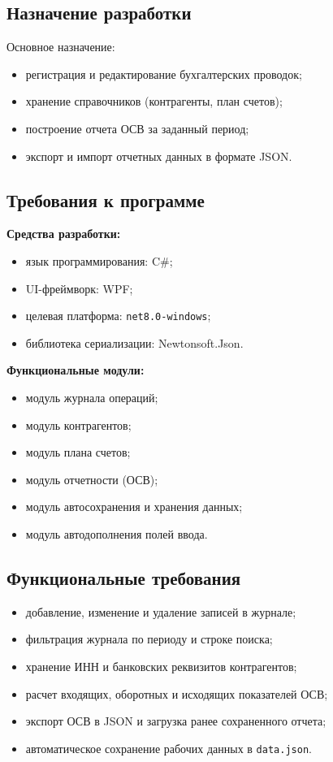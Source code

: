 \documentclass[14pt,a4paper]{extarticle}
\begin{document}
\subsection{Назначение разработки}
Основное назначение:
\begin{itemize}
    \item регистрация и редактирование бухгалтерских проводок;
    \item хранение справочников (контрагенты, план счетов);
    \item построение отчета ОСВ за заданный период;
    \item экспорт и импорт отчетных данных в формате JSON.
\end{itemize}

\subsection{Требования к программе}
\textbf{Средства разработки:}
\begin{itemize}
    \item язык программирования: C\#;
    \item UI-фреймворк: WPF;
    \item целевая платформа: \texttt{net8.0-windows};
    \item библиотека сериализации: Newtonsoft.Json.
\end{itemize}

\textbf{Функциональные модули:}
\begin{itemize}
    \item модуль журнала операций;
    \item модуль контрагентов;
    \item модуль плана счетов;
    \item модуль отчетности (ОСВ);
    \item модуль автосохранения и хранения данных;
    \item модуль автодополнения полей ввода.
\end{itemize}

\subsection{Функциональные требования}
\begin{itemize}
    \item добавление, изменение и удаление записей в журнале;
    \item фильтрация журнала по периоду и строке поиска;
    \item хранение ИНН и банковских реквизитов контрагентов;
    \item расчет входящих, оборотных и исходящих показателей ОСВ;
    \item экспорт ОСВ в JSON и загрузка ранее сохраненного отчета;
    \item автоматическое сохранение рабочих данных в \texttt{data.json}.
\end{itemize}
\end{document}
